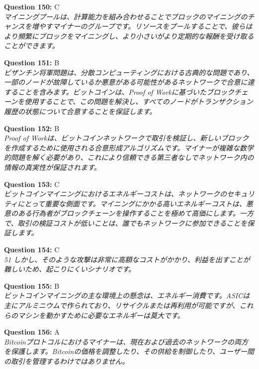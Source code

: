 \documentclass[12pt,a4paper]{article}
\begin{document}
\begin{enumerate}
{{{{{{{{\item \textbf{Question 150:} C
\\ \textit{マイニングプールは、計算能力を組み合わせることでブロックのマイニングのチャンスを増やすマイナーのグループです。リソースをプールすることで、彼らはより頻繁にブロックをマイニングし、より小さいがより定期的な報酬を受け取ることができます。}

\item \textbf{Question 151:} B
\\ \textit{ビザンチン将軍問題は、分散コンピューティングにおける古典的な問題であり、一部のノードが故障しているか悪意がある可能性があるネットワークで合意に達することを含みます。ビットコインは、Proof of Workに基づいたブロックチェーンを使用することで、この問題を解決し、すべてのノードがトランザクション履歴の状態について合意することを保証します。}

\item \textbf{Question 152:} B
\\ \textit{Proof of Workは、ビットコインネットワークで取引を検証し、新しいブロックを作成するために使用される合意形成アルゴリズムです。マイナーが複雑な数学的問題を解く必要があり、これにより信頼できる第三者なしでネットワーク内の情報の真実性が保証されます。}

\item \textbf{Question 153:} C
\\ \textit{ビットコインマイニングにおけるエネルギーコストは、ネットワークのセキュリティにとって重要な側面です。マイニングにかかる高いエネルギーコストは、悪意のある行為者がブロックチェーンを操作することを極めて高価にします。一方で、取引の検証コストが低いことは、誰でもネットワークに参加できることを保証します。}

\item \textbf{Question 154:} C
\\ \textit{51%
しかし、そのような攻撃は非常に高額なコストがかかり、利益を出すことが難しいため、起こりにくいシナリオです。}

\item \textbf{Question 155:} B
\\ \textit{ビットコインマイニングの主な環境上の懸念は、エネルギー消費です。ASICは主にアルミニウムで作られており、リサイクルまたは再利用が可能ですが、これらのマシンを動かすために必要なエネルギーは莫大です。}

\item \textbf{Question 156:} A
\\ \textit{Bitcoinプロトコルにおけるマイナーは、現在および過去のネットワークの両方を保護します。Bitcoinの価格を調整したり、その供給を制御したり、ユーザー間の取引を管理するわけではありません。}

}}}}}}}}
\end{enumerate}
\end{document}
